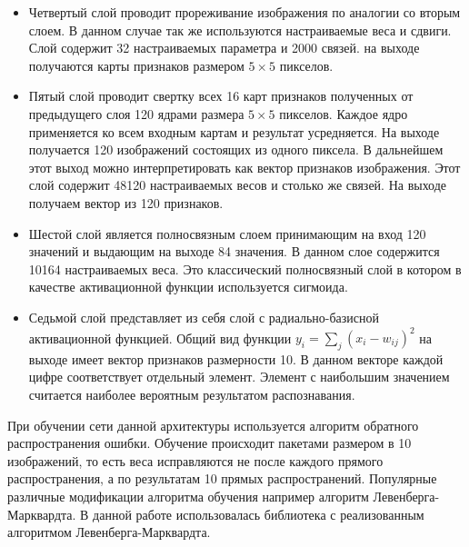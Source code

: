 \documentclass[utf8,usehyperref,14pt]{G7-32}
\begin{document}
\begin{itemize}
\item Четвертый слой проводит прореживание изображения по аналогии со вторым слоем. В данном случае так же используются настраиваемые веса и сдвиги. Слой содержит 32 настраиваемых параметра и 2000 связей. на выходе получаются карты признаков размером $ 5 \times 5 $ пикселов.
\item Пятый слой проводит свертку всех 16 карт признаков полученных от предыдущего слоя 120 ядрами размера $ 5 \times 5 $ пикселов. Каждое ядро применяется ко всем входным картам и результат усредняется. На выходе получается 120 изображений состоящих из одного пиксела. В дальнейшем этот выход можно интерпретировать как вектор признаков изображения. Этот слой содержит 48120 настраиваемых весов и столько же связей. На выходе получаем вектор из 120 признаков.
\item Шестой слой является полносвязным слоем принимающим на вход 120 значений и выдающим на выходе 84 значения. В данном слое содержится 10164 настраиваемых веса. Это классический полносвязный слой в котором в качестве активационной функции используется сигмоида.
\item Седьмой слой представляет из себя слой с радиально-базисной активационной функцией. Общий вид функции $ y_{i} = \sum_{j}(x_{i} - w_{ij})^2 $ на выходе имеет вектор признаков размерности 10. В данном векторе каждой цифре соответствует отдельный элемент. Элемент с наибольшим значением считается наиболее вероятным результатом распознавания.
\end{itemize}
При обучении сети данной архитектуры используется алгоритм обратного распространения ошибки. Обучение происходит пакетами размером в 10 изображений, то есть веса исправляются не после каждого прямого распространения, а по результатам 10 прямых распространений. 
Популярные различные модификации алгоритма обучения например алгоритм Левенберга-Марквардта. В данной работе использовалась библиотека с реализованным алгоритмом Левенберга-Марквардта.
\end{document}
